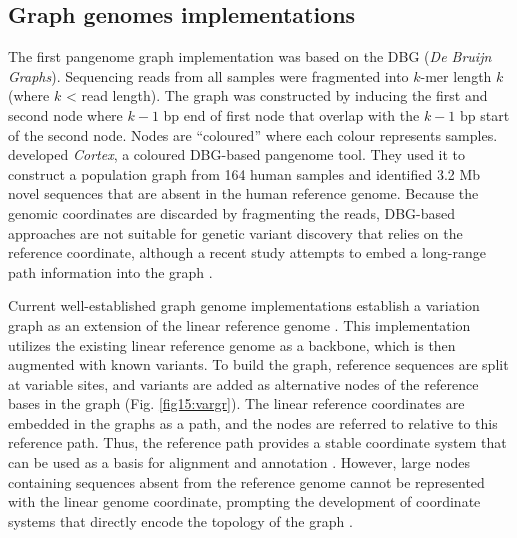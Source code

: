\documentclass[../main.tex]{subfiles}
\begin{document}
\subsection*{Graph genomes implementations}

The first pangenome graph implementation was based on the DBG (\emph{De Bruijn Graphs}). Sequencing reads from all samples were fragmented into $k$-mer length $k$ (where $k$ < read length). The graph was constructed by inducing the first and second node where $k-1$ bp end of first node that overlap with the $k-1$ bp start of the second node. Nodes are “coloured” where each colour represents samples. \citet{iqbal2012novo} developed \emph{Cortex}, a coloured DBG-based pangenome tool. They used it to construct a population graph from 164 human samples and identified 3.2 Mb novel sequences that are absent in the human reference genome. Because the genomic coordinates are discarded by fragmenting the reads, DBG-based approaches are not suitable for genetic variant discovery that relies on the reference coordinate, although a recent study attempts to embed a long-range path information into the graph \citep{turner2018integrating}. 

Current well-established graph genome implementations establish a variation graph as an extension of the linear reference genome \citep{eggertsson2017graphtyper,garrison2018variation,sibbesen2018accurate,rakocevic2019fast,kim2019graph}. This implementation utilizes the existing linear reference genome as a backbone, which is then augmented with known variants. To build the graph, reference sequences are split at variable sites, and variants are added as alternative nodes of the reference bases in the graph (Fig. \ref{fig15:vargr}). The linear reference coordinates are embedded in the graphs as a path, and the nodes are referred to relative to this reference path. Thus, the reference path provides a stable coordinate system that can be used as a basis for alignment and annotation \citep{garrison2018variation}. However, large nodes containing sequences absent from the reference genome cannot be represented with the linear genome coordinate, prompting the development of coordinate systems that directly encode the topology of the graph \citep{paten2017genome,eizenga2020pangenome}. \\
\end{document}
